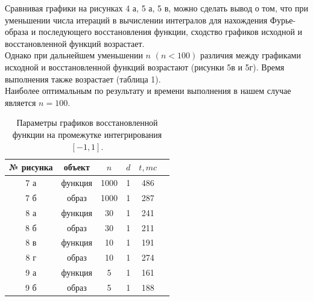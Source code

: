 \documentclass[a5paper, 10pt]{article}
\theoremstyle{definition}
\theoremstyle{plain}
\theoremstyle{remark}
\begin{document}
Сравнивая графики на рисунках 4 а, 5 а, 5 в, можно сделать вывод о том, что при уменьшении числа итераций в вычислении интегралов для нахождения Фурье-образа и последующего восстановления функции, сходство графиков исходной и восстановленной функций возрастает.\\

 Однако при дальнейшем уменьшении $n$ $(n < 100)$ различия между графиками исходной и восстановленной функций возрастают (рисунки 5в и 5г). Время выполнения также возрастает (таблица 1).\\

Наиболее оптимальным по результату и времени выполнения в нашем случае является $n=100$.

\begin{table}[h!]
\caption{Параметры графиков восстановленной функции на промежутке интегрирования $[-1, 1]$.}
\label{tabular:timesandtenses}
\begin{center}
\begin{tabular}{|c|c|c|c|c|c|}
\hline
№ рисунка & объект & $n$ & $d$ & $t, mc$  \\
\hline
 7 а&  функция &1000 & 1 & 486 \\
\hline
 7 б& образ & 1000 & 1 & 287 \\
\hline
8 а  & функция & 30 & 1 & 241 \\
\hline
8 б & образ & 30  & 1 &  211\\
\hline
8 в & функция & 10  & 1  & 191 \\
\hline
8 г & образ & 10  & 1  & 274 \\
\hline
9 а & функция & 5  & 1  & 161 \\
\hline
9 б & образ & 5  & 1  & 188 \\
\hline
\end{tabular}
\end{center}
\end{table}
\end{document}
